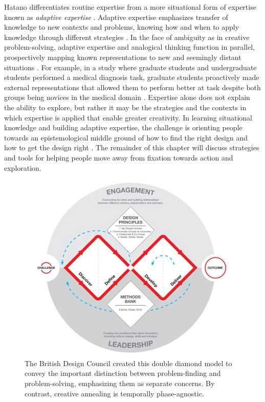 Hatano differentiates routine expertise from a more situational form of expertise known as \textit{adaptive expertise} \cite{Hatano}. Adaptive expertise emphasizes transfer of knowledge to new contexts and problems, knowing how and when to apply knowledge through different strategies \cite{Schunn2005}. In the face of ambiguity as in creative problem-solving, adaptive expertise and analogical thinking function in parallel, prospectively mapping known representations to new and seemingly distant situations \cite{chan2011benefits, gentner1997analogy, Green2016, schwartz2005efficiency, Smith1993}. For example, in a study where graduate students and undergraduate students performed a medical diagnosis task, graduate students proactively made external representations that allowed them to perform better at task despite both groups being novices in the medical domain \cite{Lee2009}. Expertise alone does not explain the ability to explore, but rather it may be the strategies and the contexts in which expertise is applied that enable greater creativity. In learning situational knowledge and building adaptive expertise, the challenge is orienting people towards an epistemological middle ground of how to find the right design and how to get the design right \cite{Buxton2007, tohidi2006getting}. The remainder of this chapter will discuss strategies and tools for helping people move away from fixation towards action and exploration.

\begin{figure}[b!]
\centering
  \includegraphics[width=.7\textwidth]{i_figures/double_diamond.jpg}
  \caption{The British Design Council created this double diamond model \cite{doublediamond} to convey the important distinction between problem-finding and problem-solving, emphasizing them as separate concerns. By contrast, creative annealing is temporally phase-agnostic.}
  \label{fig:doublediamond}
\end{figure}

